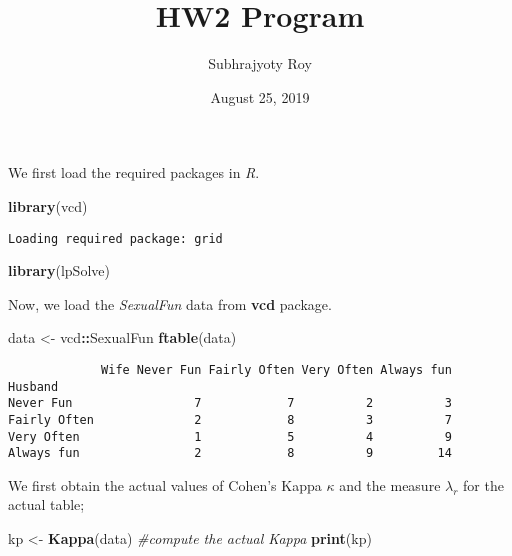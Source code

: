 \documentclass[]{article}
\title{HW2 Program}
\author{Subhrajyoty Roy}
\date{August 25, 2019}
\newenvironment{Shaded}{\begin{snugshade}}{\end{snugshade}}
\newcommand{\KeywordTok}[1]{\textcolor[rgb]{0.13,0.29,0.53}{\textbf{#1}}}
\newcommand{\StringTok}[1]{\textcolor[rgb]{0.31,0.60,0.02}{#1}}
\newcommand{\CommentTok}[1]{\textcolor[rgb]{0.56,0.35,0.01}{\textit{#1}}}
\newcommand{\OperatorTok}[1]{\textcolor[rgb]{0.81,0.36,0.00}{\textbf{#1}}}
\newcommand{\NormalTok}[1]{#1}
\begin{document}
\maketitle

We first load the required packages in \emph{R}.

\begin{Shaded}
\begin{Highlighting}[]
\KeywordTok{library}\NormalTok{(vcd)}
\end{Highlighting}
\end{Shaded}

\begin{verbatim}
Loading required package: grid
\end{verbatim}

\begin{Shaded}
\begin{Highlighting}[]
\KeywordTok{library}\NormalTok{(lpSolve)}
\end{Highlighting}
\end{Shaded}

Now, we load the \emph{SexualFun} data from \textbf{vcd} package.

\begin{Shaded}
\begin{Highlighting}[]
\NormalTok{data <-}\StringTok{ }\NormalTok{vcd}\OperatorTok{::}\NormalTok{SexualFun}
\KeywordTok{ftable}\NormalTok{(data)}
\end{Highlighting}
\end{Shaded}

\begin{verbatim}
             Wife Never Fun Fairly Often Very Often Always fun
Husband                                                       
Never Fun                 7            7          2          3
Fairly Often              2            8          3          7
Very Often                1            5          4          9
Always fun                2            8          9         14
\end{verbatim}

We first obtain the actual values of Cohen's Kappa \(\kappa\) and the
measure \(\lambda_r\) for the actual table;

\begin{Shaded}
\begin{Highlighting}[]
\NormalTok{kp <-}\StringTok{ }\KeywordTok{Kappa}\NormalTok{(data)   }\CommentTok{#compute the actual Kappa }
\KeywordTok{print}\NormalTok{(kp)}
\end{Highlighting}
\end{Shaded}
\end{document}

